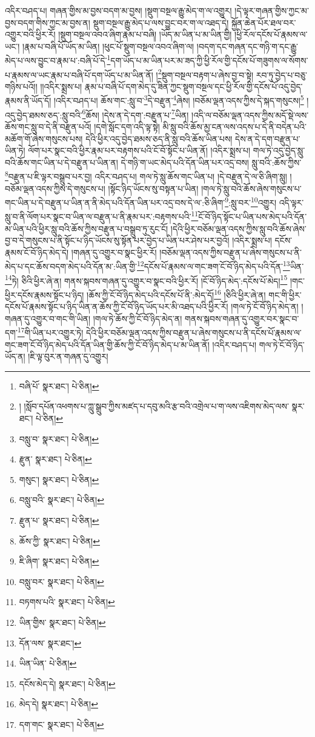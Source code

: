འདིར་བཤད་པ། གཞན་གྱིས་མ་བྱས་བདག་མ་བྱས། །སྡུག་བསྔལ་རྒྱུ་མེད་ག་ལ་འགྱུར། །དེ་ལྟར་གཞན་གྱིས་ཀྱང་མ་བྱས་བདག་གིས་ཀྱང་མ་བྱས་ན། སྡུག་བསྔལ་རྒྱུ་མེད་པ་ལས་བྱུང་བར་ག་ལ་འཐད་དེ། སྐྱོན་ཆེན་པོར་ཐལ་བར་འགྱུར་བའི་ཕྱིར་རོ། །སྡུག་བསྔལ་འབའ་ཞིག་རྣམ་པ་བཞི། །ཡོད་མ་ཡིན་པ་མ་ཡིན་གྱི། །ཕྱི་རོལ་དངོས་པོ་རྣམས་ལ་ཡང་། །རྣམ་པ་བཞི་པོ་ཡོད་མ་ཡིན། །ཕུང་པོ་སྡུག་བསྔལ་འབའ་ཞིག་ལ། །བདག་དང་གཞན་དང་གཉི་ག་དང་རྒྱུ་མེད་པ་ལས་བྱུང་བ་རྣམ་པ་:བཞི་པོ་དེ་\footnote{བཞི་པོ་  སྣར་ཐང་།  པེ་ཅིན། }དག་ཡོད་པ་མ་ཡིན་པར་མ་ཟད་ཀྱི་ཕྱི་རོལ་གྱི་དངོས་པོ་གཟུགས་ལ་སོགས་པ་རྣམས་ལ་ཡང་རྣམ་པ་བཞི་པོ་དག་ཡོད་པ་མ་ཡིན་ནོ། །\footnote{། །སློབ་དཔོན་འཕགས་པ་ཀླུ་སྒྲུབ་ཀྱིས་མཛད་པ་དབུ་མའི་རྩ་བའི་འགྲེལ་པ་ག་ལས་འཇིགས་མེད་ལས་  སྣར་ཐང་།  པེ་ཅིན། }སྡུག་བསྔལ་བརྟག་པ་ཞེས་བྱ་བ་སྟེ། རབ་ཏུ་བྱེད་པ་བཅུ་གཉིས་པའོ།། །།འདིར་སྨྲས་པ། རྣམ་པ་བཞི་པོ་དག་མེད་དུ་ཟིན་ཀྱང་སྡུག་བསྔལ་དང་ཕྱི་རོལ་གྱི་དངོས་པོ་འདུ་བྱེད་རྣམས་ནི་ཡོད་དོ། །འདིར་བཤད་པ། ཆོས་གང་:སླུ་བ་\footnote{བསླུ་བ་  སྣར་ཐང་།  པེ་ཅིན། }དེ་བརྫུན་\footnote{རྫུན་  སྣར་ཐང་།  པེ་ཅིན། }ཞེས། །བཅོམ་ལྡན་འདས་ཀྱིས་དེ་སྐད་གསུངས།\footnote{གསུང་།  སྣར་ཐང་།  པེ་ཅིན། } །འདུ་བྱེད་ཐམས་ཅད་:སླུ་བའི་\footnote{བསླུ་བའི་  སྣར་ཐང་།  པེ་ཅིན། }ཆོས། །དེས་ན་དེ་དག་:བརྫུན་པ་\footnote{རྫུན་པ་  སྣར་ཐང་།  པེ་ཅིན། }ཡིན། །འདི་ལ་བཅོམ་ལྡན་འདས་ཀྱིས་མདོ་སྡེ་ལས་ཆོས་གང་སླུ་བ་དེ་ནི་བརྫུན་པའོ། །དགེ་སློང་དག་འདི་ལྟ་སྟེ། མི་སླུ་བའི་ཆོས་མྱ་ངན་ལས་འདས་པ་དེ་ནི་བདེན་པའི་མཆོག་གོ་ཞེས་གསུངས་པས། དེའི་ཕྱིར་འདུ་བྱེད་ཐམས་ཅད་ནི་སླུ་བའི་ཆོས་ཡིན་པས། དེས་ན་དེ་དག་བརྫུན་པ་ཡིན་ཏེ། ལོག་པར་སྣང་བའི་ཕྱིར་རྣམ་པར་བརྟགས་པའི་ངོ་བོ་སྟོང་པ་ཡིན་ནོ། །འདིར་སྨྲས་པ། གལ་ཏེ་འདུ་བྱེད་སླུ་བའི་ཆོས་གང་ཡིན་པ་དེ་བརྫུན་པ་ཡིན་ན། དེ་གཉི་ག་ཡང་མེད་པའི་དོན་ཡིན་པར་འདྲ་བས། སླུ་བའི་:ཆོས་ཀྱིས་\footnote{ཆོས་ཀྱི་  སྣར་ཐང་།  པེ་ཅིན། }བརྫུན་པ་ཇི་ལྟར་བསྒྲུབ་པར་བྱ། འདིར་བཤད་པ། གལ་ཏེ་སླུ་ཆོས་གང་ཡིན་པ། །དེ་བརྫུན་དེ་ལ་ཅི་ཞིག་སླུ། །བཅོམ་ལྡན་འདས་ཀྱིས་དེ་གསུངས་པ། །སྟོང་ཉིད་ཡོངས་སུ་བསྟན་པ་ཡིན། །གལ་ཏེ་སླུ་བའི་ཆོས་ཞེས་གསུངས་པ་གང་ཡིན་པ་དེ་བརྫུན་པ་ཡིན་ན་ནི་མེད་པའི་དོན་ཡིན་པར་འདྲ་བས་དེ་ལ་:ཅི་ཞིག་\footnote{ཇི་ཞིག་  སྣར་ཐང་།  པེ་ཅིན། }:སླུ་བར་\footnote{བསླུ་བར་  སྣར་ཐང་།  པེ་ཅིན། }འགྱུར། འདི་ལྟར་སླུ་བ་ནི་ལོག་པར་སྣང་བ་ཡིན་ལ་བརྫུན་པ་ནི་རྣམ་པར་:བརྟགས་པའི་\footnote{བཏགས་པའི་  སྣར་ཐང་།  པེ་ཅིན། }ངོ་བོ་ཉིད་སྟོང་པ་ཡིན་པས་མེད་པའི་དོན་མ་ཡིན་པའི་ཕྱིར་སླུ་བའི་ཆོས་ཀྱིས་བརྫུན་པ་བསྒྲུབ་ཏུ་རུང་ངོ། །དེའི་ཕྱིར་བཅོམ་ལྡན་འདས་ཀྱིས་སླུ་བའི་ཆོས་ཞེས་བྱ་བ་དེ་གསུངས་པ་ནི་སྟོང་པ་ཉིད་ཡོངས་སུ་སྟོན་པར་བྱེད་པ་ཡིན་པར་ཤེས་པར་བྱའོ། །འདིར་སྨྲས་པ། དངོས་རྣམས་ངོ་བོ་ཉིད་མེད་དེ། །གཞན་དུ་འགྱུར་བ་སྣང་ཕྱིར་རོ། །བཅོམ་ལྡན་འདས་ཀྱིས་བརྫུན་པ་ཞེས་གསུངས་པ་ནི་མེད་པ་དང་ཆོས་བདག་མེད་པའི་དོན་མ་:ཡིན་གྱི་\footnote{ཡིན་གྱིས་  སྣར་ཐང་།  པེ་ཅིན། }དངོས་པོ་རྣམས་ལ་གང་ཟག་ངོ་བོ་ཉིད་མེད་པའི་དོན་\footnote{དོན་ལས་  སྣར་ཐང་། }ཡིན་\footnote{ཡིན་ཡིན་  པེ་ཅིན། }ཏེ། ཅིའི་ཕྱིར་ཞེ་ན། གནས་སྐབས་གཞན་དུ་འགྱུར་བ་སྣང་བའི་ཕྱིར་རོ། །ངོ་བོ་ཉིད་མེད་:དངོས་པོ་མེད།\footnote{དངོས་མེད་དེ།  སྣར་ཐང་།  པེ་ཅིན། } །གང་ཕྱིར་དངོས་རྣམས་སྟོང་པ་ཉིད། །ཆོས་ཀྱི་ངོ་བོ་ཉིད་མེད་པའི་དངོས་པོ་ནི་:མེད་དོ།\footnote{མེད་དེ།  སྣར་ཐང་།  པེ་ཅིན། } །ཅིའི་ཕྱིར་ཞེ་ན། གང་གི་ཕྱིར་དངོས་པོ་རྣམས་སྟོང་པ་ཉིད་ཡིན་ན་ཆོས་ཀྱི་ངོ་བོ་ཉིད་ཡོད་པར་མི་འཐད་པའི་ཕྱིར་རོ། །གལ་ཏེ་ངོ་བོ་ཉིད་མེད་ན། །གཞན་དུ་འགྱུར་བ་གང་གི་ཡིན། །གལ་ཏེ་ཆོས་ཀྱི་ངོ་བོ་ཉིད་མེད་ན། གནས་སྐབས་གཞན་དུ་འགྱུར་བར་སྣང་བ་དག་\footnote{དག་གང་  སྣར་ཐང་།  པེ་ཅིན། }གི་ཡིན་པར་འགྱུར་ཏེ། དེའི་ཕྱིར་བཅོམ་ལྡན་འདས་ཀྱིས་བརྫུན་པ་ཞེས་གསུངས་པ་ནི་དངོས་པོ་རྣམས་ལ་གང་ཟག་ངོ་བོ་ཉིད་མེད་པའི་དོན་ཡིན་གྱི་ཆོས་ཀྱི་ངོ་བོ་ཉིད་མེད་པ་མ་ཡིན་ནོ། །འདིར་བཤད་པ། གལ་ཏེ་ངོ་བོ་ཉིད་ཡོད་ན། །ཇི་ལྟ་བུར་ན་གཞན་དུ་འགྱུར། 